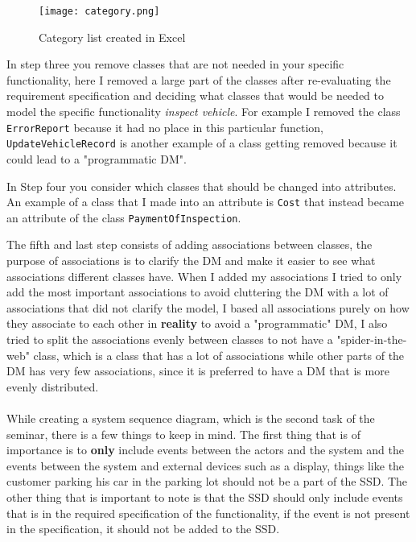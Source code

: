 \documentclass[a4paper]{scrreprt}
\begin{document}
\begin{figure}[h]
  \begin{center}
    \texttt{[image: category.png]}
    \caption{Category list created in Excel}
    \label{fig:category}
  \end{center}
\end{figure}

\noindent In step three you remove classes that are not needed in your specific functionality, here I removed a large part of the classes after re-evaluating the requirement specification and deciding what classes that would be needed to model the specific functionality \textit{inspect vehicle}. For example I removed the class \texttt{ErrorReport} because it had no place in this particular function, \texttt{UpdateVehicleRecord} is another example of a class getting removed because it could lead to a "programmatic DM".

In Step four you consider which classes that should be changed into attributes. An example of a class that I made into an attribute is \texttt{Cost} that instead became an attribute of the class \texttt{PaymentOfInspection}.

The fifth and last step consists of adding associations between classes, the purpose of associations is to clarify the DM and make it easier to see what associations different classes have. When I added my associations I tried to only add the most important associations to avoid cluttering the DM with a lot of associations that did not clarify the model, I based all associations purely on how they associate to each other in \textbf{{reality}} to avoid a "programmatic" DM, I also tried to split the associations evenly between classes to not have a "spider-in-the-web" class, which is a class that has a lot of associations while other parts of the DM has very few associations, since it is preferred to have a DM that is more evenly distributed.\\
\\
While creating a system sequence diagram, which is the second task of the seminar, there is a few things to keep in mind. The first thing that is of importance is to \textbf{only} include events between the actors and the system and the events between the system and external devices such as a display, things like the customer parking his car in the parking lot should not be a part of the SSD. The other thing that is important to note is that the SSD should only include events that is in the required specification of the functionality, if the event is not present in the specification, it should not be added to the SSD.
\end{document}

